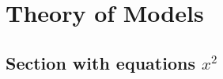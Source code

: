 \newpage
\chapter{Theory of Models}

\lipsum[5-6]

\section{Section with equations \texorpdfstring{$x^2$}{x squared}}
\lipsum[1]
